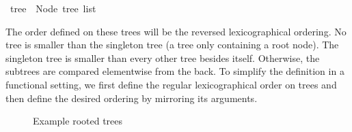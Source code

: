\begin{isabellebox}
\isamarkupfalse%
\ tree\ {\isacharequal}{\kern0pt}\ Node\ {\isachardoublequoteopen}tree\ list{\isachardoublequoteclose}
\end{isabellebox}

The order defined on these trees will be the reversed lexicographical ordering.
No tree is smaller than the singleton tree (a tree only containing a root node).
The singleton tree is smaller than every other tree besides itself.
Otherwise, the subtrees are compared elementwise from the back.
To simplify the definition in a functional setting, we first define the regular lexicographical order on trees and then define the desired ordering by mirroring its arguments.

\begin{figure}[htpb]
    \centering
    \hspace{2cm}
\caption{Example rooted trees}
\label{fig:example_rooted_trees}
\end{figure}

